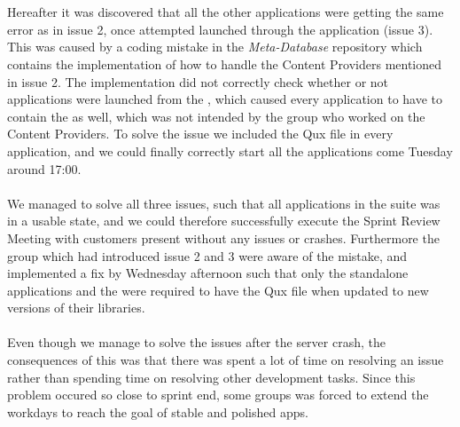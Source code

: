 \\\\
Hereafter it was discovered that all the other applications were getting the same error as in issue 2, once attempted launched through the \launcher application (issue 3). This was caused by a coding mistake in the \emph{Meta-Database} repository which contains the implementation of how to handle the Content Providers mentioned in issue 2. The implementation did not correctly check whether or not applications were launched from the \giraf \launcher, which caused every application to have to contain the  as well, which was not intended by the group who worked on the Content Providers. To solve the issue we included the Qux file in every application, and we could finally correctly start all the applications come Tuesday around 17:00. 
\\\\
We managed to solve all three issues, such that all applications in the \giraf suite was in a usable state, and we could therefore successfully execute the Sprint Review Meeting with customers present without any issues or crashes. Furthermore the group which had introduced issue 2 and 3 were aware of the mistake, and implemented a fix by Wednesday afternoon such that only the standalone applications and the \giraf \launcher were required to have the Qux file when updated to new versions of their libraries.
\\\\
Even though we manage to solve the issues after the server crash, the consequences of this was that there was spent a lot of time on resolving an issue rather than spending time on resolving other development tasks. Since this problem occured so close to sprint end, some groups was forced to extend the workdays to reach the goal of stable and polished apps.